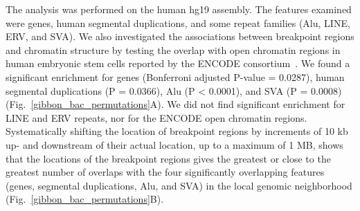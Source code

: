 \documentclass [11pt] {report}
\begin{document}
The analysis was performed on the human hg19 assembly. The features examined were genes, human segmental duplications, and some repeat families (Alu, LINE, ERV, and SVA). We also investigated the associations between breakpoint regions and chromatin structure by testing the overlap with open chromatin regions in human embryonic stem cells reported by the ENCODE consortium~\cite{ENCODEProjectConsortium:2011iz}. We found a significant enrichment for genes (Bonferroni adjusted P-value = 0.0287), human segmental duplications (P = 0.0366), Alu (P < 0.0001), and SVA (P = 0.0008) (Fig.~\ref{gibbon_bac_permutations}A). We did not find significant enrichment for LINE and ERV repeats, nor for the ENCODE open chromatin regions. Systematically shifting the location of breakpoint regions by increments of 10 kb up- and downstream of their actual location, up to a maximum of 1 MB, shows that the locations of the breakpoint regions gives the greatest or close to the greatest number of overlaps with the four significantly overlapping features (genes, segmental duplications, Alu, and SVA) in the local genomic neighborhood (Fig.~\ref{gibbon_bac_permutations}B).
\end{document}
